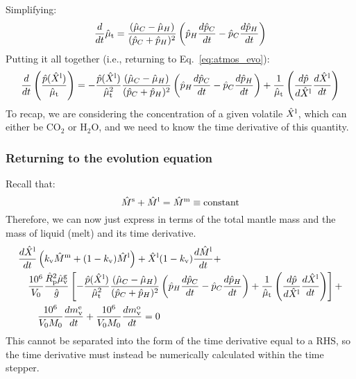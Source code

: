 Simplifying:
\begin{equation}
\frac{d}{dt} \hat{\mu}_{\rm t} = \frac{(\hat{\mu}_C-\hat{\mu}_H)}{(\hat{p}_C+\hat{p}_H)^2} \left( \hat{p}_H \frac{d\hat{p}_C}{dt} - \hat{p}_C \frac{d\hat{p}_H}{dt} \right)
\end{equation}
Putting it all together (i.e., returning to Eq.~\ref{eq:atmos_evo}):
\begin{equation}
\frac{d}{dt} \left( \frac{\hat{p}(\hat{X}^{\rm l})}{\hat{\mu}_{\rm t}} \right) = -\frac{\hat{p}(\hat{X}^{\rm l})}{\hat{\mu}_{\rm t}^2} \frac{(\hat{\mu}_C-\hat{\mu}_H)}{(\hat{p}_C+\hat{p}_H)^2} \left( \hat{p}_H \frac{d\hat{p}_C}{dt} - \hat{p}_C \frac{d\hat{p}_H}{dt} \right) + \frac{1}{\hat{\mu}_{\rm t}} \left( \frac{d \hat{p}}{d \hat{X}^{\rm l}} \frac{d \hat{X}^{\rm l}}{d t} \right)
\end{equation}
To recap, we are considering the concentration of a given volatile $\hat{X}^{\rm l}$, which can either be CO$_2$ or H$_2$O, and we need to know the time derivative of this quantity.  
\subsubsection{Returning to the evolution equation}
Recall that:
\begin{equation}
\hat{M}^{\rm s} + \hat{M}^{\rm l} = \hat{M}^{\rm m} \equiv \text{constant}
\label{eq:mantle_mass}
\end{equation}
Therefore, we can now just express in terms of the total mantle mass and the mass of liquid (melt) and its time derivative.  
\begin{align}
&\frac{d \hat{X}^{\rm l}}{d t} \left(k_{\rm v} \hat{M}^{\rm m} + (1-k_{\rm v}) \hat{M}^{\rm l} \right)
+ \hat{X}^{\rm l} (1-k_{\rm v}) \frac{d \hat{M}^{\rm l}}{d t} + \nonumber \\
&\quad \frac{10^6}{V_0} \frac{\hat{R}_{\rm p}^2 \hat{\mu}_{\rm v}^{\rm g}}{\hat{g}}
\left[
-\frac{\hat{p}(\hat{X}^{\rm l})}{\hat{\mu}_{\rm t}^2} \frac{(\hat{\mu}_C-\hat{\mu}_H)}{(\hat{p}_C+\hat{p}_H)^2} \left( \hat{p}_H \frac{d\hat{p}_C}{dt} - \hat{p}_C \frac{d\hat{p}_H}{dt} \right) + \frac{1}{\hat{\mu}_{\rm t}} \left( \frac{d \hat{p}}{d \hat{X}^{\rm l}} \frac{d \hat{X}^{\rm l}}{d t} \right)
\right]+ \nonumber \\
& \qquad \frac{10^6}{V_0 M_0} \frac{dm_{\rm v}^{\rm e}}{dt} + \frac{10^6}{V_0 M_0} \frac{dm_{\rm v}^{\rm o}}{dt} = 0
\end{align}
This cannot be separated into the form of the time derivative equal to a RHS, so the time derivative must instead be numerically calculated within the time stepper.
